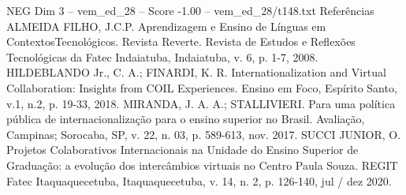 \begin{textsample}{NEG Dim 3 – vem\_ed\_28 – Score -1.00 – vem\_ed\_28/t148.txt}
Referências ALMEIDA FILHO, J.C.P.
Aprendizagem e Ensino de Línguas em ContextosTecnológicos.
Revista Reverte.
Revista de Estudos e Reflexões Tecnológicas da Fatec Indaiatuba, Indaiatuba, v. 6, p. 1-7, 2008.
HILDEBLANDO Jr., C.
A.; FINARDI, K.
R.
Internationalization and Virtual Collaboration: Insights from COIL Experiences.
Ensino em Foco, Espírito Santo, v.1, n.2, p. 19-33, 2018.
MIRANDA, J.
A.
A.; STALLIVIERI.
Para uma política pública de internacionalização para o ensino superior no Brasil.
Avaliação, Campinas; Sorocaba, SP, v. 22, n. 03, p. 589-613, nov. 2017.
SUCCI JUNIOR, O.
Projetos Colaborativos Internacionais na Unidade do Ensino Superior de Graduação: a evolução dos intercâmbios virtuais no Centro Paula Souza.
REGIT Fatec Itaquaquecetuba, Itaquaquecetuba, v. 14, n. 2, p. 126-140, jul / dez 2020.

\end{textsample}
